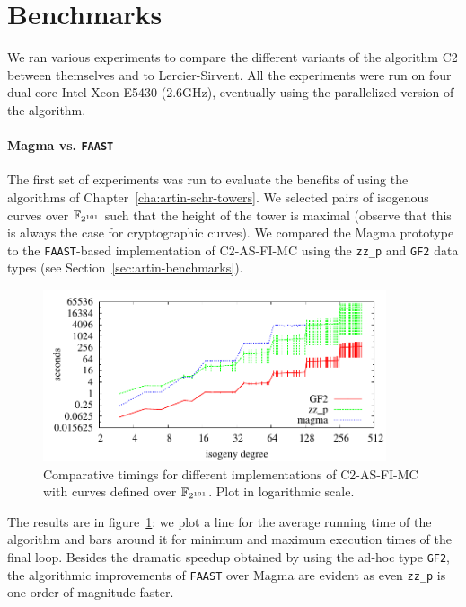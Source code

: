 \section{Benchmarks}
\label{sec:benchmarks}
We ran various experiments to compare the different variants of the
algorithm C2 between themselves and to Lercier-Sirvent. All the
experiments were run on four dual-core Intel Xeon E5430 (2.6GHz),
eventually using the parallelized version of the algorithm.

\paragraph{Magma vs. \texttt{FAAST}}
\label{sec:magma-vs.-textttf}
The first set of experiments was run to evaluate the benefits of using
the algorithms of Chapter~\ref{cha:artin-schr-towers}. We selected
pairs of isogenous curves over $\mathbb{F}_{2^{101}}$ such that the height of
the tower is maximal (observe that this is always the case for
cryptographic curves).  We compared the Magma prototype to the
\texttt{FAAST}-based implementation of C2-AS-FI-MC using the
\texttt{zz\_p} and \texttt{GF2} data types (see
Section~\ref{sec:artin-benchmarks}).

\begin{figure}
  \centering
  \includegraphics[width=0.9\textwidth]{isogeny/p2}
  \caption{Comparative timings for different implementations of C2-AS-FI-MC with curves defined over $\mathbb{F}_{2^{101}}$. Plot in logarithmic scale.}
  \label{fig:2-101}
\end{figure}

The results are in figure~\ref{fig:2-101}: we plot a line for the
average running time of the algorithm and bars around it for minimum
and maximum execution times of the final loop. Besides the dramatic
speedup obtained by using the ad-hoc type \texttt{GF2}, the
algorithmic improvements of \texttt{FAAST} over Magma are evident as
even \texttt{zz\_p} is one order of magnitude faster.

